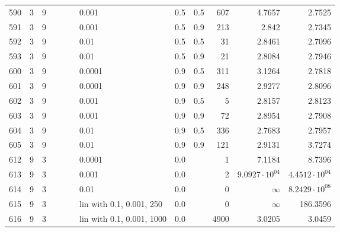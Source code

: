 \begin{longtable}{lrrrrrlrrrrr}
 590 &       3 & 9 &   &   &   &                       0.001 &  0.5 &    0.5 &     607 &                 4.7657 &                 2.7525 \\
 591 &       3 & 9 &   &   &   &                       0.001 &  0.5 &    0.9 &     213 &                  2.842 &                 2.7345 \\
 592 &       3 & 9 &   &   &   &                        0.01 &  0.5 &    0.5 &      31 &                 2.8461 &                 2.7096 \\
 593 &       3 & 9 &   &   &   &                        0.01 &  0.5 &    0.9 &      21 &                 2.8084 &                 2.7946 \\
 600 &       3 & 9 &   &   &   &                      0.0001 &  0.9 &    0.5 &     311 &                 3.1264 &                 2.7818 \\
 601 &       3 & 9 &   &   &   &                      0.0001 &  0.9 &    0.9 &     248 &                 2.9277 &                 2.8096 \\
 602 &       3 & 9 &   &   &   &                       0.001 &  0.9 &    0.5 &       5 &                 2.8157 &                 2.8123 \\
 603 &       3 & 9 &   &   &   &                       0.001 &  0.9 &    0.9 &      72 &                 2.8954 &                 2.7908 \\
 604 &       3 & 9 &   &   &   &                        0.01 &  0.9 &    0.5 &     336 &                 2.7683 &                 2.7957 \\
 605 &       3 & 9 &   &   &   &                        0.01 &  0.9 &    0.9 &     121 &                 2.9131 &                 3.7274 \\
 612 &       9 & 3 &   &   &   &                      0.0001 &  0.0 &        &       1 &                 7.1184 &                 8.7396 \\
 613 &       9 & 3 &   &   &   &                       0.001 &  0.0 &        &       2 &  $9.0927\cdot 10^{04}$ &  $4.4512\cdot 10^{04}$ \\
 614 &       9 & 3 &   &   &   &                        0.01 &  0.0 &        &       0 &               $\infty$ &  $8.2429\cdot 10^{08}$ \\
 615 &       9 & 3 &   &   &   &    lin with 0.1, 0.001, 250 &  0.0 &        &       0 &               $\infty$ &               186.3596 \\
 616 &       9 & 3 &   &   &   &   lin with 0.1, 0.001, 1000 &  0.0 &        &    4900 &                 3.0205 &                 3.0459 \\

\end{longtable}
